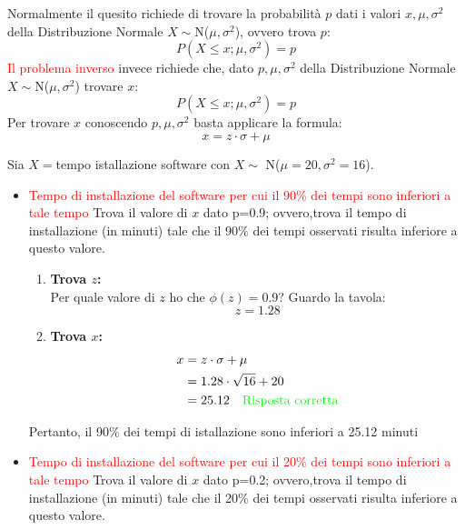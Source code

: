 \documentclass{article}  %
\theoremstyle{definition}
\begin{document}
\begin{esempio}
	Normalmente il quesito richiede di trovare la probabilità $p$ dati i valori $x, \mu, \sigma^2$ della Distribuzione Normale $X \sim$N($\mu, \sigma^2$), ovvero trova $p$:
	\[
		P(X \leq x; \mu, \sigma^2)=p
	\]
	\textcolor{red}{Il problema inverso} invece richiede che, dato $p, \mu, \sigma^2$ della Distribuzione Normale $X \sim$N($\mu, \sigma^2$) trovare $x$:
	\[
		P(X \leq x; \mu, \sigma^2)=p
	\]
	Per trovare $x$ conoscendo $p, \mu, \sigma^2$ basta applicare la formula:
	\[
		x=z \cdot \sigma+\mu
	\]
	\begin{esercizio}
		Sia $X=$tempo istallazione software con $X \sim$ N($\mu=20, \sigma^2=16$).
		\begin{itemize}
			\item \textcolor{red}{Tempo di installazione del software per cui il 90$\%$ dei tempi sono inferiori a tale tempo}
			      Trova il valore di $x$ dato p=0.9; ovvero,trova il tempo di installazione (in minuti) tale che il 90$\%$ dei tempi osservati risulta inferiore a questo valore.

			      \begin{enumerate}
				      \item \textbf{Trova $z$:} \\
				            Per quale valore di $z$ ho che $\phi(z)=0.9$? Guardo la tavola:
				            \[
					            z=1.28
				            \]
				      \item \textbf{Trova $x$:}
				            \begin{align*}
					            x
					             & = z\cdot \sigma + \mu                                     \\
					             & = 1.28 \cdot \sqrt{16}+20                                 \\
					             & = 25.12 \quad \textcolor{green}{\text{Risposta corretta}}
				            \end{align*}
			      \end{enumerate}
			      Pertanto, il 90$\%$ dei tempi di istallazione sono inferiori a 25.12 minuti
			\item \textcolor{red}{Tempo di installazione del software per cui il 20$\%$ dei tempi sono inferiori a tale tempo}
			      Trova il valore di $x$ dato p=0.2; ovvero,trova il tempo di installazione (in minuti) tale che il 20$\%$ dei tempi osservati risulta inferiore a questo valore.


\end{itemize}
\end{esercizio}
\end{esempio}
\end{document}
